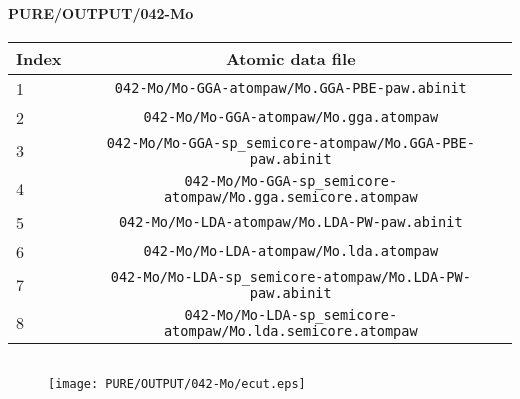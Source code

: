 \documentclass[onecolumn]{revtex4}
\begin{document}
\paragraph*{\bf{PURE/OUTPUT/042-Mo}}
\begin{center}
\begin{tabular}{lc}
\hline
Index & Atomic data file \\
\hline
1 & \verb?042-Mo/Mo-GGA-atompaw/Mo.GGA-PBE-paw.abinit?\\
2 & \verb?042-Mo/Mo-GGA-atompaw/Mo.gga.atompaw?\\
3 & \verb?042-Mo/Mo-GGA-sp_semicore-atompaw/Mo.GGA-PBE-paw.abinit?\\
4 & \verb?042-Mo/Mo-GGA-sp_semicore-atompaw/Mo.gga.semicore.atompaw?\\
5 & \verb?042-Mo/Mo-LDA-atompaw/Mo.LDA-PW-paw.abinit?\\
6 & \verb?042-Mo/Mo-LDA-atompaw/Mo.lda.atompaw?\\
7 & \verb?042-Mo/Mo-LDA-sp_semicore-atompaw/Mo.LDA-PW-paw.abinit?\\
8 & \verb?042-Mo/Mo-LDA-sp_semicore-atompaw/Mo.lda.semicore.atompaw?\\
\hline
\end{tabular}
\end{center}
\begin{center}
\begin{tabular}{lccccc}
\hline
\hline
\end{tabular}
\end{center}
\begin{figure}[h] 
\centering 
\texttt{[image: PURE/OUTPUT/042-Mo/ecut.eps]}
\end{figure}
\newpage
\end{document}
